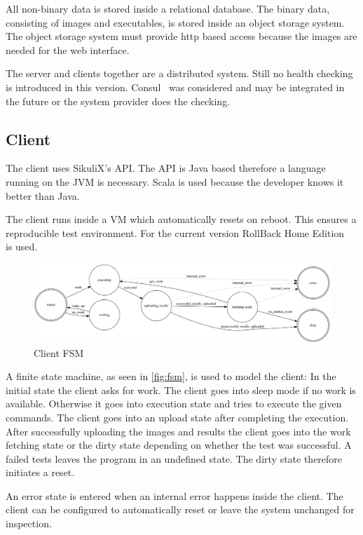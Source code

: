 \documentclass[a4paper,twocolumn]{article}
\begin{document}
All non-binary data is stored inside a relational database.
The binary data, consisting of images and executables, is stored inside an object storage system.
The object storage system must provide http based access because the images are needed for the web interface.

The server and clients together are a distributed system.
Still no health checking is introduced in this version.
Consul~\cite{Consul} was considered and may be integrated in the future or the system provider does the checking.

\subsection{Client}
The client uses SikuliX's API.
The API is Java based therefore a language running on the JVM is necessary.
Scala is used because the developer knows it better than Java.

The client runs inside a VM which automatically resets on reboot.
This ensures a reproducible test environment.
For the current version RollBack Home Edition~\cite{RollBack} is used.

\begin{figure}[btp]
	\centering
	\includegraphics[width=1.0\linewidth]{../img/client_fsm}
	\caption{Client FSM}
	\label{fig:fsm}
\end{figure}
A finite state machine, as seen in \autoref{fig:fsm}, is used to model the client:
In the initial state the client asks for work.
The client goes into sleep mode if no work is available.
Otherwise it goes into execution state and tries to execute the given commands.
The client goes into an upload state after completing the execution.
After successfully uploading the images and results the client goes into the work fetching state or the dirty state depending on whether the test was successful.
A failed tests leaves the program in an undefined state.
The dirty state therefore initiates a reset.

An error state is entered when an internal error happens inside the client.
The client can be configured to automatically reset or leave the system unchanged for inspection.
\end{document}
